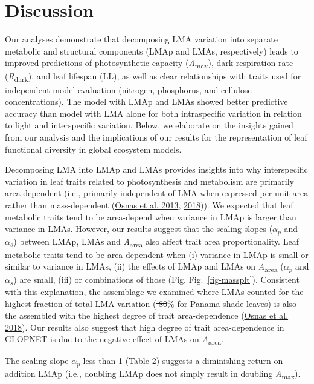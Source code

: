 \documentclass[
  12pt,
  a4paper,
,tablecaptionabove
]{scrartcl}
\providecommand{\DIFaddtex}[1]{{\protect\color{blue}\uwave{#1}}} %
\providecommand{\DIFdeltex}[1]{{\protect\color{red}\sout{#1}}}                      %
\providecommand{\DIFaddbegin}{} %
\providecommand{\DIFaddend}{} %
\providecommand{\DIFdelbegin}{} %
\providecommand{\DIFdelend}{} %
\providecommand{\DIFadd}[1]{\texorpdfstring{\DIFaddtex{#1}}{#1}} %
\providecommand{\DIFdel}[1]{\texorpdfstring{\DIFdeltex{#1}}{}} %
\newcommand{\DIFscaledelfig}{0.5}
\newlength{\DIFdelgraphicswidth} %
\newlength{\DIFdelgraphicsheight} %
\newcommand{\DIFaddincludegraphics}[2][]{{\color{blue}\fbox{\DIFOincludegraphics[#1]{#2}}}} %
\newcommand{\DIFdelincludegraphics}[2][]{%
\sbox{\DIFdelgraphicsbox}{\DIFOincludegraphics[#1]{#2}}%
\settoboxwidth{\DIFdelgraphicswidth}{\DIFdelgraphicsbox} %
\settoboxtotalheight{\DIFdelgraphicsheight}{\DIFdelgraphicsbox} %
\scalebox{\DIFscaledelfig}{%
\parbox[b]{\DIFdelgraphicswidth}{\usebox{\DIFdelgraphicsbox}\\[-\baselineskip] \rule{\DIFdelgraphicswidth}{0em}}\llap{\resizebox{\DIFdelgraphicswidth}{\DIFdelgraphicsheight}{%
\setlength{\unitlength}{\DIFdelgraphicswidth}%
\begin{picture}(1,1)%
\thicklines\linethickness{2pt} %
{\color[rgb]{1,0,0}\put(0,0){\framebox(1,1){}}}%
{\color[rgb]{1,0,0}\put(0,0){\line( 1,1){1}}}%
{\color[rgb]{1,0,0}\put(0,1){\line(1,-1){1}}}%
\end{picture}%
}\hspace*{3pt}}} %
} %
\DeclareRobustCommand{\DIFaddbegin}{\DIFOaddbegin \let\includegraphics\DIFaddincludegraphics} %
\DeclareRobustCommand{\DIFaddend}{\DIFOaddend \let\includegraphics\DIFOincludegraphics} %
\DeclareRobustCommand{\DIFdelbegin}{\DIFOdelbegin \let\includegraphics\DIFdelincludegraphics} %
\DeclareRobustCommand{\DIFdelend}{\DIFOaddend \let\includegraphics\DIFOincludegraphics} %
\begin{document}
\hypertarget{discussion}{%
\section{Discussion}\label{discussion}}

Our analyses demonstrate that decomposing LMA variation into separate
metabolic and structural components (LMAp and LMAs, respectively) leads
to improved predictions of photosynthetic capacity
(\emph{A}\textsubscript{max}), dark respiration rate
(\emph{R}\textsubscript{dark}), and leaf lifespan (LL), as well as clear
relationships with traits used for independent model evaluation
(nitrogen, phosphorus, and cellulose concentrations). The model with
LMAp and LMAs showed better predictive accuracy than model with LMA
alone for both intraspecific variation in relation to light and
interspecific variation. Below, we elaborate on the insights gained from
our analysis and the implications of our results for the representation
of leaf functional diversity in global ecosystem models.

Decomposing LMA into LMAp and LMAs provides insights into why
interspecific variation in leaf traits related to photosynthesis and
metabolism are primarily area-dependent (i.e., primarily independent of
LMA when expressed per-unit area rather than mass-dependent
(\protect\hyperlink{ref-Osnas2013}{Osnas et al. 2013},
\protect\hyperlink{ref-Osnas2018}{2018})). We expected that leaf
metabolic traits tend to be area-depend when variance in LMAp is larger
than variance in LMAs. However, our results suggest that the scaling
slopes (\(\alpha_p\) and \(\alpha_s\)) between LMAp, LMAs and
\emph{A}\textsubscript{area} also affect trait area proportionality.
Leaf metabolic traits tend to be area-dependent when (i) variance in
LMAp is small or similar to variance in LMAs, (ii) the effects of LMAp
and LMAs on \emph{A}\textsubscript{area} (\(\alpha_p\) and \(\alpha_s\))
are small, (iii) or combinations of those (Fig. Fig.~\ref{fig-massplt}).
Consistent with this explanation, the assemblage we examined where LMAs
counted for the highest fraction of total LMA variation (\DIFdelbegin \DIFdel{-80}\DIFdelend \DIFaddbegin \DIFadd{93.4}\DIFaddend \% for
Panama shade leaves) is also the assembled with the highest degree of
trait area-dependence (\protect\hyperlink{ref-Osnas2018}{Osnas et al.
2018}). Our results also suggest that high degree of trait
area-dependence in GLOPNET is due to the negative effect of LMAs on
\emph{A}\textsubscript{area}.

The scaling slope \(\alpha_p\) less than 1 (Table 2) suggests a
diminishing return on addition LMAp (i.e., doubling LMAp does not simply
result in doubling \emph{A}\textsubscript{max}).
\end{document}

